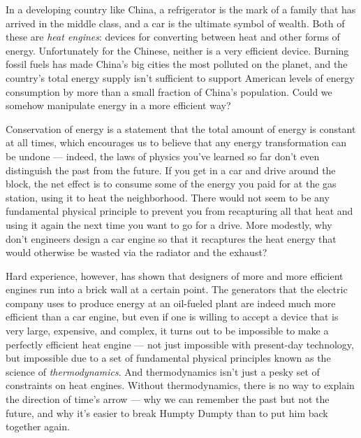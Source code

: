 
In a developing country like China, a refrigerator is the
mark of a family that has arrived in the middle class, and a
car is the ultimate symbol of wealth. Both of these
are \emph{heat engines}: devices for 
converting between heat and other
forms of energy.
Unfortunately for the Chinese, neither is a very efficient
device. Burning fossil fuels has made China's big cities the
most polluted on the planet, and the country's total energy
supply isn't sufficient to support American levels of energy
consumption by more than a small fraction of China's
population. Could we somehow manipulate
energy in a more efficient way?

Conservation of energy is a statement that the total amount of
energy is constant at all times, which encourages us to
believe that any energy transformation can be undone ---
indeed, the laws of physics you've learned so far don't even
distinguish the past from the future.
If you get in a car and drive around the block,
the net effect is to consume some of the energy you paid
for at the gas station,  using it to heat the neighborhood.
There would not seem to be any fundamental physical principle
to prevent you from recapturing all that heat and using it again
the next time you want to go for a drive. More modestly,
why don't engineers design a car engine so that
it recaptures the heat
energy that would otherwise be wasted via
the radiator and the exhaust?

Hard experience, however, has shown that designers of more
and more efficient engines run into a brick wall at a
certain point. The generators that the electric company uses
to produce energy at an oil-fueled plant are indeed much
more efficient than a car engine, but even if one is willing
to accept a device that is very large, expensive, and
complex, it turns out to be impossible to make a perfectly
efficient heat engine --- not just impossible with present-day
technology, but impossible due to a set of fundamental physical
principles known as the science of \emph{thermodynamics}.
And thermodynamics isn't just a pesky set of constraints on 
heat engines. Without thermodynamics, there is no way to explain
the direction of time's arrow --- why we can remember the past
but not the future, and why it's easier to break Humpty Dumpty than
to put him back together again.


